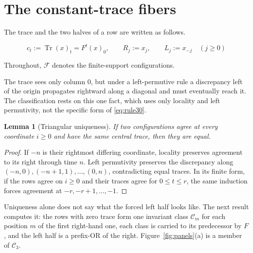 \documentclass[11pt]{article}
\newtheorem{lemma}[theorem]{Lemma}
\newcommand{\F}{\mathcal F}
\newcommand{\Tr}{\operatorname{Tr}}
\begin{document}
\section{The constant-trace fibers}

The trace and the two halves of a row are written as follows.

\begin{equation}\label{eq:notation}
 c_t:=\Tr(x)_t=F^t(x)_0,\qquad R_j:=x_j,\qquad L_j:=x_{-j}\quad(j\geq0)
\end{equation}

Throughout, $\F$ denotes the finite-support configurations.

The trace sees only column $0$, but under a left-permutive rule a discrepancy
left of the origin propagates rightward along a diagonal and must eventually
reach it.  The classification rests on this one fact, which uses only locality
and left permutivity, not the specific form of \eqref{eq:rule30}.

\begin{lemma}[Triangular uniqueness]\label{lem:unique}
If two configurations agree at every coordinate $i\geq0$ and have the same
central trace, then they are equal.
\end{lemma}
\begin{proof}
If $-n$ is their rightmost differing coordinate, locality preserves agreement
to its right through time $n$.  Left permutivity preserves the discrepancy
along $(-n,0),(-n+1,1),\ldots,(0,n)$, contradicting equal traces.  In its
finite form, if the rows agree on $i\geq0$ and their traces agree for
$0\leq t\leq r$, the same induction forces agreement at
$-r,-r+1,\ldots,-1$.
\end{proof}

Uniqueness alone does not say what the forced left half looks like.  The next
result computes it: the rows with zero trace form one invariant class
$\mathcal C_m$ for each position $m$ of the first right-hand one, each class is
carried to its predecessor by $F$, and the left half is a prefix-OR of the
right.  Figure~\ref{fig:panels}(a) is a member of $\mathcal C_3$.
\end{document}
